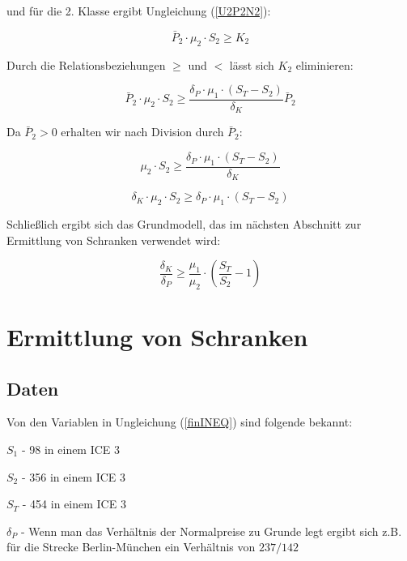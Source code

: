 \documentclass[a4paper,12pt]{article}
\begin{document}
 und für die 2. Klasse ergibt Ungleichung (\ref{U2P2N2}):
 
 \begin{equation}
  \bar P_2 \cdot \mu_2 \cdot S_2 \geq K_2 
 \end{equation}

Durch die Relationsbeziehungen $\geq$ und $<$ lässt sich $K_2$ eliminieren:

 \begin{equation}
 \bar P_2 \cdot \mu_2 \cdot S_2 \geq \frac{\delta_P \cdot \mu_1 \cdot  (S_T - S_2)}{\delta_K} \bar P_2
 \label{2mach1}
 \end{equation}
 
 Da $\bar P_2>0$ erhalten wir nach Division durch $\bar P_2$:
 
 \begin{equation}
\mu_2 \cdot S_2 \geq \frac{\delta_P \cdot \mu_1 \cdot  (S_T - S_2)}{\delta_K} 
 \end{equation} 
 
 \begin{equation}
 \delta_K \cdot \mu_2 \cdot S_2 \geq  \delta_P \cdot \mu_1 \cdot  (S_T - S_2) 
 \end{equation}

Schließlich ergibt sich das Grundmodell, das im nächsten Abschnitt zur Ermittlung von Schranken verwendet wird:

 \begin{equation}
\frac{\delta_K}{\delta_P} \geq  \frac{\mu_1}{\mu_2} \cdot  \left( \frac{S_T}{S_2 } - 1 \right)
\label{finINEQ}
 \end{equation}
 

 
 \section{Ermittlung von Schranken}
 \subsection{Daten} \label{Daten}
 Von den Variablen in Ungleichung (\ref{finINEQ}) sind folgende bekannt:

 $S_1$ - 98 in einem ICE 3 
 
 $S_2$ - 356 in einem ICE 3
 
 $S_T$ - 454 in einem ICE 3
 
 $\delta_P$ - Wenn man das Verhältnis der Normalpreise zu Grunde legt ergibt sich z.B. für die Strecke Berlin-München ein Verhältnis von $237/142$
 
\end{document}
